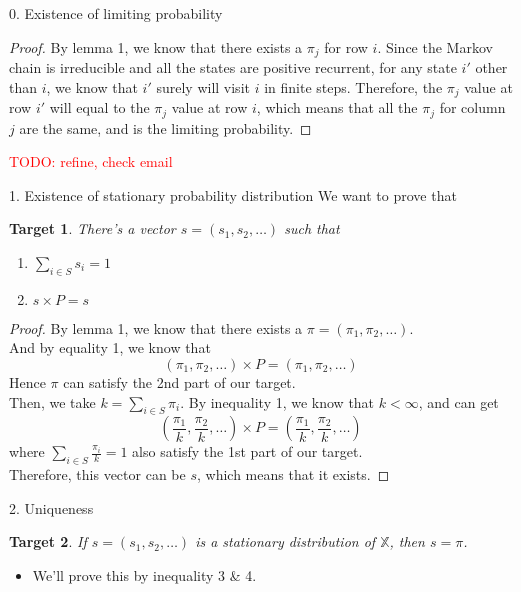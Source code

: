 \documentclass{beamer}
\newtheorem{target}{Target}
\begin{document}
\begin{frame}{0. Existence of limiting probability}
	\begin{proof}
		By lemma 1, we know that there exists a $\pi_j$ for row $i$.
		Since the Markov chain is irreducible and all the states are positive recurrent, 
		for any state $i'$ other than $i$, we know that $i'$ surely will visit $i$ in finite steps.
		Therefore, the $\pi_j$ value at row $i'$ will equal to the $\pi_j$ value at row $i$,
		which means that all the $\pi_j$ for column $j$ are the same, and is the limiting probability.
	\end{proof}
	\textcolor{red}{TODO: refine, check email}
\end{frame}

\begin{frame}{1. Existence of stationary probability distribution}
	We want to prove that
	\begin{target}
		There's a vector $s = (s_1, s_2, \ldots)$ such that
		\begin{enumerate}
			\item $\sum_{i \in S} s_i = 1$
			\item $s \times P = s$
		\end{enumerate}
	\end{target}
\end{frame}

\begin{frame}
	\begin{proof}
		By lemma 1, we know that there exists a $\pi = (\pi_1, \pi_2, \ldots)$. \\
		And by equality 1, we know that
		\[
		(\pi_1, \pi_2, \ldots) \times P = (\pi_1, \pi_2, \ldots)
		\]
		Hence $\pi$ can satisfy the 2nd part of our target. \\
		Then, we take $k = \sum_{i \in S} \pi_i$.
		By inequality 1, we know that $k < \infty$, and can get
		\[
		(\frac{\pi_1}{k}, \frac{\pi_2}{k}, \ldots) \times P = (\frac{\pi_1}{k}, \frac{\pi_2}{k}, \ldots)
		\]
		where $\sum_{i \in S} \frac{\pi_i}{k} = 1$ also satisfy the 1st part of our target. \\
		Therefore, this vector can be $s$, which means that it exists.
	\end{proof}
\end{frame}

\begin{frame}{2. Uniqueness}
	\begin{target}
		If $s = (s_1, s_2, \ldots)$ is a stationary distribution of $\mathbb{X}$, then $s = \pi$.
	\end{target}
	\begin{itemize}
		\item We'll prove this by inequality 3 \& 4.
	\end{itemize}
\end{frame}
\end{document}
